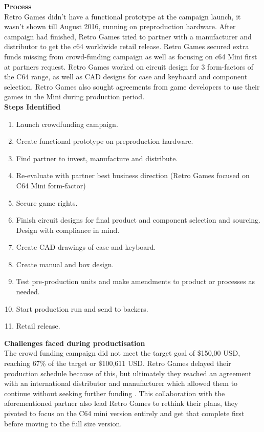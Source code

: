 \textbf{Process}\\
Retro Games didn't have a functional prototype at the campaign launch, it wasn't shown till August 2016, running on preproduction hardware. After campaign had finished, Retro Games tried to partner with a manufacturer and distributor to get the c64 worldwide retail release. Retro Games secured extra funds missing from crowd-funding campaign as well as focusing on c64 Mini first at partners request. Retro Games worked on circuit design for 3 form-factors of the C64 range, as well as CAD designs for case and keyboard and component selection. Retro Games also sought agreements from game developers to use their games in the Mini during production period. \\

\textbf{Steps Identified}
\begin{enumerate}
\item Launch crowdfunding campaign.
\item Create functional prototype on preproduction hardware.
\item Find partner to invest, manufacture and distribute.
\item Re-evaluate with partner best business direction (Retro Games focused on C64 Mini form-factor)
\item Secure game rights.
\item Finish circuit designs for final product and component selection and sourcing. Design with compliance in mind.
\item Create CAD drawings of case and keyboard.
\item Create manual and box design.
\item Test pre-production units and make amendments to product or processes as needed.
\item Start production run and send to backers.
\item Retail release.
\end{enumerate} 

\textbf{Challenges faced during productisation}\\
The crowd funding campaign did not meet the target goal of \$150,00 USD, reaching 67\% of the target or \$100,611 USD. Retro Games delayed their production schedule because of this, but ultimately they reached an agreement with an international distributor and manufacturer which allowed them to continue without seeking further funding
\cite{RN125}. This collaboration with the aforementioned partner also lead Retro Games to rethink their plans, they pivoted to focus on the C64 mini version entirely and get that complete first before moving to the full size version. \\


